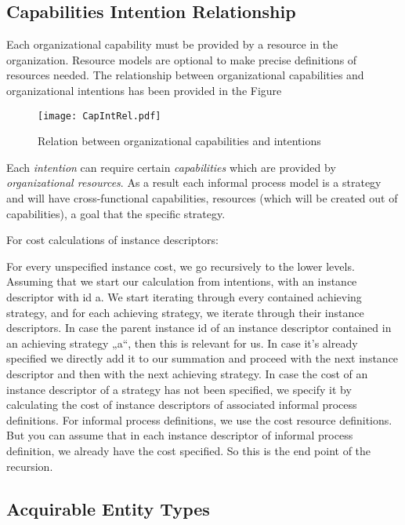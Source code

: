 \subsection{Capabilities Intention Relationship}
\label{sec:capIntRel}

 Each organizational capability must be provided by a resource in the organization. Resource models are optional to make precise definitions of resources needed. The relationship between organizational capabilities and organizational intentions has been provided in the Figure 
 
 \begin{figure}
 	\centering
 	\texttt{[image: CapIntRel.pdf]}
 	\caption{Relation between organizational capabilities and intentions}
 	\label{fig:orgcapabilities}
 \end{figure}

Each \textit{intention} can require certain \textit{capabilities} which are provided by \textit{organizational resources}. 
As a result each informal process model is a strategy and will have cross-functional capabilities, resources (which will be created out of capabilities), a goal that the specific strategy.

For cost calculations of instance descriptors:

For every unspecified instance cost, we go recursively to the lower levels. Assuming that we start our calculation from intentions, with an instance descriptor with id a. We start iterating through every contained achieving strategy, and for each achieving strategy, we iterate through their instance descriptors. In case the parent instance id of an instance descriptor contained in an achieving strategy „a“, then this is relevant for us. In case it’s already specified we directly add it to our summation and proceed with the next instance descriptor and then with the next achieving strategy. In case the cost of an instance descriptor of a strategy has not been specified, we specify it by calculating the cost of instance descriptors of associated informal process definitions. For informal process definitions, we use the cost resource definitions. But you can assume that in each instance descriptor of informal process definition, we already have the cost specified. So this is the end point of the recursion.

\subsection{Acquirable Entity Types}
\label{sec:acquirableentities}



